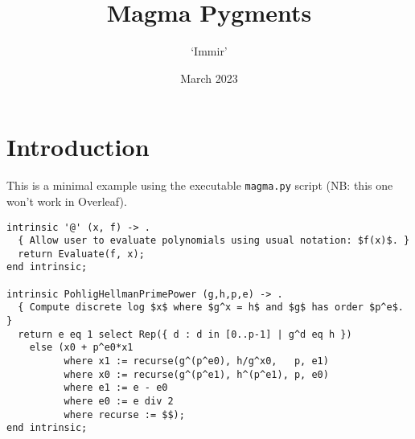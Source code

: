 \documentclass{article}
\title{Magma Pygments}
\author{`Immir'}
\date{March 2023}
\begin{document}
\maketitle

\section*{Introduction}

This is a minimal example using the executable \texttt{magma.py}
script (NB: this one won't work in Overleaf).

\begin{verbatim}
intrinsic '@' (x, f) -> .
  { Allow user to evaluate polynomials using usual notation: $f(x)$. }
  return Evaluate(f, x);
end intrinsic;

intrinsic PohligHellmanPrimePower (g,h,p,e) -> .
  { Compute discrete log $x$ where $g^x = h$ and $g$ has order $p^e$. }
  return e eq 1 select Rep({ d : d in [0..p-1] | g^d eq h })
    else (x0 + p^e0*x1
          where x1 := recurse(g^(p^e0), h/g^x0,   p, e1)
          where x0 := recurse(g^(p^e1), h^(p^e1), p, e0)
          where e1 := e - e0
          where e0 := e div 2
          where recurse := $$);
end intrinsic;
\end{verbatim}
\end{document}
